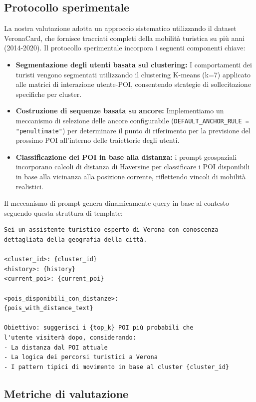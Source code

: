 \subsection{Protocollo sperimentale}

La nostra valutazione adotta un approccio sistematico utilizzando il dataset VeronaCard, che fornisce tracciati completi della mobilità turistica su più anni (2014-2020). Il protocollo sperimentale incorpora i seguenti componenti chiave:

\begin{itemize}
\item \textbf{Segmentazione degli utenti basata sul clustering:} I comportamenti dei turisti vengono segmentati utilizzando il clustering K-means (k=7) applicato alle matrici di interazione utente-POI, consentendo strategie di sollecitazione specifiche per cluster.
\item \textbf{Costruzione di sequenze basata su ancore:} Implementiamo un meccanismo di selezione delle ancore configurabile (\texttt{DEFAULT\_ANCHOR\_RULE = "penultimate"}) per determinare il punto di riferimento per la previsione del prossimo POI all'interno delle traiettorie degli utenti. \item \textbf{Classificazione dei POI in base alla distanza:} i prompt geospaziali incorporano calcoli di distanza di Haversine per classificare i POI disponibili in base alla vicinanza alla posizione corrente, riflettendo vincoli di mobilità realistici.
\end{itemize}

Il meccanismo di prompt genera dinamicamente query in base al contesto seguendo questa struttura di template:

\begin{lstlisting}[language=text, caption=Comprehensive Context Prompt Template]
Sei un assistente turistico esperto di Verona con conoscenza dettagliata della geografia della città.

<cluster_id>: {cluster_id}
<history>: {history}
<current_poi>: {current_poi}

<pois_disponibili_con_distanze>:
{pois_with_distance_text}

Obiettivo: suggerisci i {top_k} POI più probabili che 
l'utente visiterà dopo, considerando:
- La distanza dal POI attuale
- La logica dei percorsi turistici a Verona
- I pattern tipici di movimento in base al cluster {cluster_id}
\end{lstlisting}

\subsection{Metriche di valutazione}


